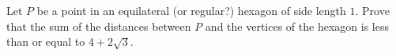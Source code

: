 Let $P$ be a point in an equilateral (or regular?) hexagon of side length $1$.
Prove that the sum of the distances between $P$ and the vertices of the hexagon
is less than or equal to $4 + 2\sqrt{3}$.
